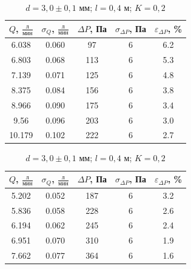 \documentclass[a4paper,12pt]{article}
\begin{document}
\begin{table}[h!]
\centering
\begin{minipage}{0.48\textwidth}
\centering
    \begin{tabular}{|c|c|c|c|c|}
        \hline
        $Q$, $\frac{\text{л}}{\text{мин}}$ & $\sigma_Q$, $\frac{\text{л}}{\text{мин}}$  & $\Delta P$, Па & $\sigma_{\Delta P}$, Па & $\varepsilon_{\Delta P}$, \% \\
        \hline
        6.038 & 0.060 & 97 & 6 & 6.2 \\ \hline
        6.803 & 0.068 & 113 & 6 & 5.3 \\ \hline
        7.139 & 0.071 & 125 & 6 & 4.8 \\ \hline
        8.375 & 0.084 & 156 & 6 & 3.8 \\ \hline
        8.966 & 0.090 & 175 & 6 & 3.4 \\ \hline
        9.56 &  0.096  & 203 & 6 & 3.0 \\ \hline
        10.179 &0.102 & 222 & 6 & 2.7 \\ \hline
    \end{tabular}
    \caption{$d = 3,0 \pm 0,1$ мм; $l = 0,2$ м; $K = 0,2$}
\end{minipage}
\hfill
\begin{minipage}{0.48\textwidth}
\centering
    \begin{tabular}{|c|c|c|c|c|}
        \hline
        $Q$, $\frac{\text{л}}{\text{мин}}$ & $\sigma_Q$, $\frac{\text{л}}{\text{мин}}$ & $\Delta P$, Па & $\sigma_{\Delta P}$, Па & $\varepsilon_{\Delta P}$, \% \\
        \hline
        5.202 & 0.052 & 187 & 6 & 3.2 \\ \hline
        5.836 & 0.058 & 228 & 6 & 2.6 \\ \hline
        6.194 & 0.062 & 245 & 6 & 2.4 \\ \hline
        6.951 & 0.070 & 310 & 6 & 1.9 \\ \hline
        7.662 & 0.077 & 364 & 6 & 1.6 \\ \hline
    \end{tabular}
    \caption{$d = 3,0 \pm 0,1$ мм; $l = 0,4$ м; $K = 0,2$}
\end{minipage}
\end{table}


\end{document}
